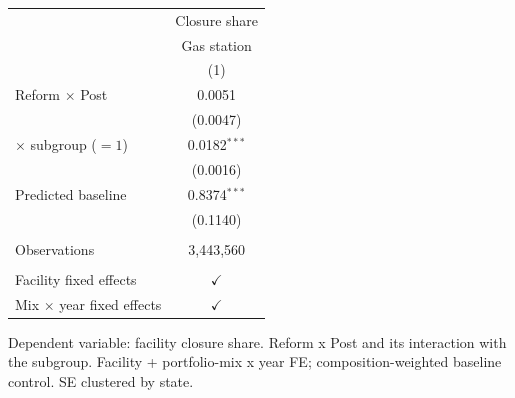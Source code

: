 
\begingroup
\centering
\begin{tabular}{lc}
   \toprule
                                    & Closure share\\  
                                    & Gas station \\   
                                    & (1)\\  
   \midrule 
   Reform $\times$ Post             & 0.0051\\   
                                    & (0.0047)\\   
   \quad $\times$ subgroup ($=1$)   & 0.0182$^{***}$\\   
                                    & (0.0016)\\   
   Predicted baseline               & 0.8374$^{***}$\\   
                                    & (0.1140)\\   
    \\
   Observations                     & 3,443,560\\  
    \\
   Facility fixed effects           & $\checkmark$\\   
   Mix $\times$ year fixed effects  & $\checkmark$\\   
   \bottomrule
\end{tabular}
 
\par \raggedright 
Dependent variable: facility closure share. Reform x Post and its interaction with the subgroup. Facility + portfolio-mix x year FE; composition-weighted baseline control. SE clustered by state.
\par\endgroup



